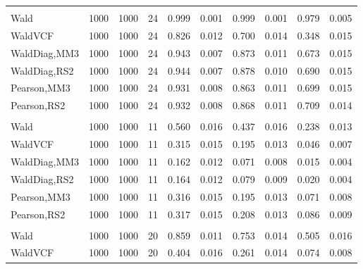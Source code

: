 \documentclass[
]{article}
\begin{document}
\begin{table}[H]
{\begin{tabular}[t]{lrrrrrrlrr}
\addlinespace[0.3em]
\multicolumn{10}{l}{\textbf{1F 15V}}\\
\hspace{1em}Wald & 1000 & 1000 & 24 & 0.999 & 0.001 & 0.999 & 0.001 & 0.979 & 0.005\\
\hspace{1em}WaldVCF & 1000 & 1000 & 24 & 0.826 & 0.012 & 0.700 & 0.014 & 0.348 & 0.015\\
\hspace{1em}WaldDiag,MM3 & 1000 & 1000 & 24 & 0.943 & 0.007 & 0.873 & 0.011 & 0.673 & 0.015\\
\hspace{1em}WaldDiag,RS2 & 1000 & 1000 & 24 & 0.944 & 0.007 & 0.878 & 0.010 & 0.690 & 0.015\\
\hspace{1em}Pearson,MM3 & 1000 & 1000 & 24 & 0.931 & 0.008 & 0.863 & 0.011 & 0.699 & 0.015\\
\hspace{1em}Pearson,RS2 & 1000 & 1000 & 24 & 0.932 & 0.008 & 0.868 & 0.011 & 0.709 & 0.014\\
\addlinespace[0.3em]
\multicolumn{10}{l}{\textbf{2F 10V}}\\
\hspace{1em}Wald & 1000 & 1000 & 11 & 0.560 & 0.016 & 0.437 & 0.016 & 0.238 & 0.013\\
\hspace{1em}WaldVCF & 1000 & 1000 & 11 & 0.315 & 0.015 & 0.195 & 0.013 & 0.046 & 0.007\\
\hspace{1em}WaldDiag,MM3 & 1000 & 1000 & 11 & 0.162 & 0.012 & 0.071 & 0.008 & 0.015 & 0.004\\
\hspace{1em}WaldDiag,RS2 & 1000 & 1000 & 11 & 0.164 & 0.012 & 0.079 & 0.009 & 0.020 & 0.004\\
\hspace{1em}Pearson,MM3 & 1000 & 1000 & 11 & 0.316 & 0.015 & 0.195 & 0.013 & 0.071 & 0.008\\
\hspace{1em}Pearson,RS2 & 1000 & 1000 & 11 & 0.317 & 0.015 & 0.208 & 0.013 & 0.086 & 0.009\\
\addlinespace[0.3em]
\multicolumn{10}{l}{\textbf{3F 15V}}\\
\hspace{1em}Wald & 1000 & 1000 & 20 & 0.859 & 0.011 & 0.753 & 0.014 & 0.505 & 0.016\\
\hspace{1em}WaldVCF & 1000 & 1000 & 20 & 0.404 & 0.016 & 0.261 & 0.014 & 0.074 & 0.008\\

\end{tabular}}
\end{table}
\end{document}
